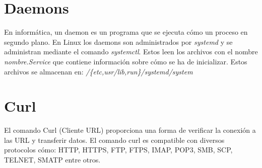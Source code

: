 \section{Daemons}

En informática, un daemon es un programa que se ejecuta cómo un proceso en segundo plano.
En Linux los daemons son administrados por \textit{systemd} y se administran mediante el comando \textit{systemctl}. Estos leen los archivos con el nombre \textit{nombre.Service} que contiene información sobre cómo se ha de inicializar. Estos archivos se almacenan en: \textit{/\{etc,usr/lib,run\}/systemd/system}\cite{pagina:daemons_linux}


\section{Curl}

El comando Curl (Cliente URL) proporciona una forma de verificar la conexión a las URL y transferir datos. El comando curl es compatible con diversos protocolos cómo: HTTP, HTTPS, FTP, FTPS, IMAP, POP3, SMB, SCP, TELNET, SMATP entre otros.\cite{pagina:Curl}


